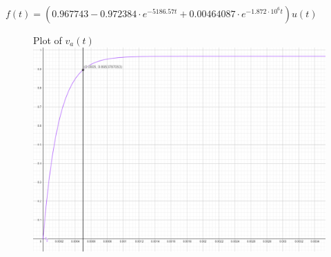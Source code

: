 \documentclass[11pt]{article}
\begin{document}
	$f(t)=(0.967743-0.972384\cdot e^{-5186.57t}+0.00464087\cdot e^{-1.872 \cdot 10^{6}t})u(t)$
	
	\begin{figure}[H]
		\centering
		Plot of $v_a(t)$\\
		\includegraphics[width=6.55in]{images/function_graph.png}
	\end{figure}
	
\end{document}
